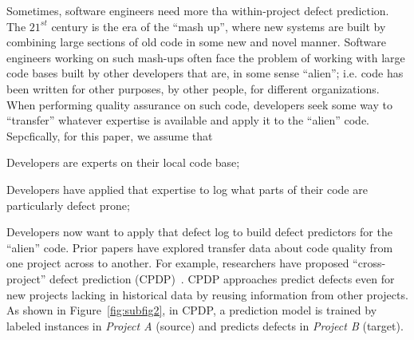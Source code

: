 Sometimes, software engineers
need more tha within-project defect prediction.
The $21^{\mathit{st}}$ century is the era of the ``mash up'',
where new systems are built by combining large sections of old
code in some new and novel manner.
Software engineers working on such mash-ups often face
the problem of working with  large code bases built by other developers that are, in some sense ``alien''; i.e.
code has been written for other purposes, 
by other people, for different organizations.  When performing
quality assurance on such code, developers
seek some way to ``transfer'' whatever expertise is
available and apply it to the ``alien'' code.  
Sepcfically, for this
paper, we assume that
\bi
\item
Developers are experts on  their local code base;
\item
Developers have applied that expertise to log what parts
of their code are particularly defect prone;
\item
Developers now want to apply that defect log to
build defect predictors for the ``alien'' code.
\ei
Prior papers have explored transfer data
about code quality from one project across to another.
For example, researchers
have proposed ``cross-project'' defect
prediction (CPDP)~\cite{He12, Ma12, Nam13, Rahman12, Turhan09, Zimmermann09}.
CPDP approaches predict defects even for new projects lacking
in historical data by reusing information from other projects. As shown in Figure~\ref{fig:subfig2}, in CPDP,
a prediction model is trained by
labeled instances in {\em Project A} (source) and predicts defects in {\em Project B} (target).

% 

